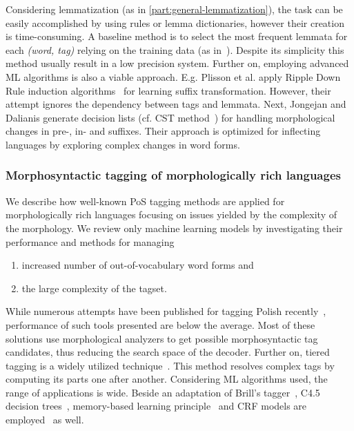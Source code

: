 Considering lemmatization (as in \ref{part:general-lemmatization}), the task can be easily accomplished by using rules or lemma dictionaries, however their creation is time-consuming.
A baseline method is to select the most frequent lemmata for each \emph{(word, tag)} relying on the training data (as in~\cite{zsibrata2013magyarlanc}). 
Despite its simplicity this method usually result in a low precision system.
Further on, employing advanced ML algorithms is also a viable approach.
E.g. Plisson et al. apply Ripple Down Rule induction algorithms~\cite{Plisson2004} for learning suffix transformation.
However, their attempt ignores the dependency between tags and lemmata.
Next, Jongejan and Dalianis generate decision lists (cf. CST method~\cite{Jongejan}) for handling morphological changes in pre-, in- and suffixes.
Their approach is optimized for inflecting languages by exploring complex changes in word forms.  

\subsubsection{Morphosyntactic tagging of morphologically rich languages}

We describe how well-known PoS tagging methods are applied for morphologically rich languages focusing on issues yielded by the complexity of the morphology.
We review only machine learning models by investigating their performance and methods for managing
\begin{enumerate}
  \item increased number of out-of-vocabulary word forms and
  \item the large complexity of the tagset. 
\end{enumerate}

While numerous attempts have been published for tagging Polish recently~\cite{Piasecki2006,Piasecki2007,Acedanski2010,Radziszewski2013},  performance of such tools presented are below the average.
Most of these solutions use morphological analyzers to get possible morphosyntactic tag candidates, thus reducing the search space of the decoder.
Further on, tiered tagging is a widely utilized technique~\cite{Radziszewski2013}.
This method resolves complex tags by computing its parts one after another.
Considering ML algorithms used, the range of applications is wide.
Beside an adaptation of Brill’s tagger~\cite{Acedanski2010}, C4.5 decision trees~\cite{Piasecki2007}, memory-based learning principle~\cite{Radziszewski2011} and CRF models are employed~\cite{Radziszewski2013} as well. 

